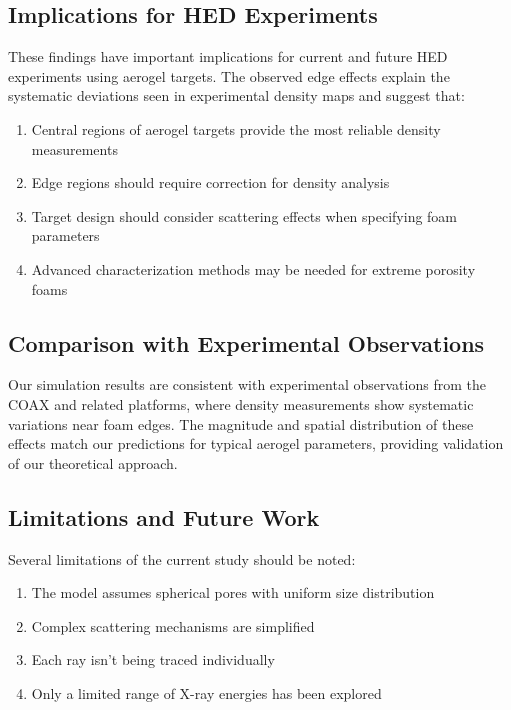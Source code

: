 \documentclass[twocolumn]{aastex701}
\begin{document}
\subsection{Implications for HED Experiments}

These findings have important implications for current and future HED experiments using aerogel targets. The observed edge effects explain the systematic deviations seen in experimental density maps and suggest that:

\begin{enumerate}
    \item Central regions of aerogel targets provide the most reliable density measurements
    \item Edge regions should require correction for density analysis
    \item Target design should consider scattering effects when specifying foam parameters
    \item Advanced characterization methods may be needed for extreme porosity foams
\end{enumerate}

\subsection{Comparison with Experimental Observations}

Our simulation results are consistent with experimental observations from the COAX and related platforms, where density measurements show systematic variations near foam edges. The magnitude and spatial distribution of these effects match our predictions for typical aerogel parameters, providing validation of our theoretical approach.

\subsection{Limitations and Future Work}

Several limitations of the current study should be noted:

\begin{enumerate}
    \item The model assumes spherical pores with uniform size distribution
    \item Complex scattering mechanisms are simplified
    \item Each ray isn't being traced individually
    \item Only a limited range of X-ray energies has been explored
\end{enumerate}
\end{document}
